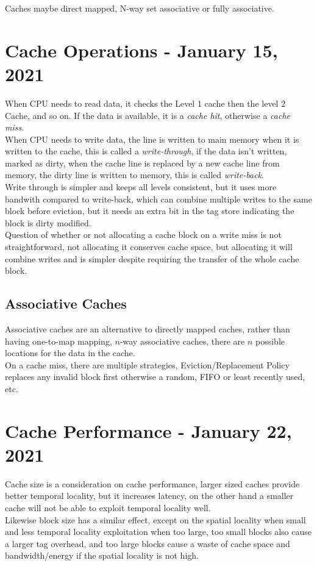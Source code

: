 \documentclass[11pt,a4paper,twocolumn]{book}
\begin{document}
Caches maybe direct mapped, N-way set associative or fully associative.

\chapter{Cache Operations - January 15, 2021}

When CPU needs to read data, it checks the Level 1 cache then the level 2 Cache, and so on. If the data is available, it is a \textit{cache hit}, otherwise a \textit{cache miss}.\\

When CPU needs to write data, the line is written to main memory when it is written to the cache, this is called a \textit{write-through}, if the data isn't written, marked as dirty, when the cache line is replaced by a new cache line from memory, the dirty line is written to memory, this is called \textit{write-back}.\\

Write through is simpler and keeps all levels consistent, but it uses more bandwith compared to write-back, which can combine multiple writes to the same block before eviction,  but it needs an extra bit in the tag store indicating the block is dirty modified.\\

Question of whether or not allocating a cache block on a write miss is not straightforward, not allocating it conserves cache space, but allocating it will combine writes and is simpler despite requiring the transfer of the whole cache block.

\section{Associative Caches}

Associative caches are an alternative to directly mapped caches, rather than having one-to-map mapping, $n$-way associative caches, there are $n$ possible locations for the data in the cache.\\

On a cache miss, there are multiple strategies, Eviction/Replacement Policy replaces any invalid block first otherwise a random, FIFO or least recently used, etc.

\chapter{Cache Performance - January 22, 2021}

Cache size is a consideration on cache performance, larger sized caches provide better temporal locality, but it increases latency, on the other hand a smaller cache will not be able to exploit temporal locality well.\\

Likewise block size has a similar effect, except on the spatial locality when small and less temporal locality exploitation when too large, too small blocks also cause a larger tag overhead, and too large blocks cause a waste of cache space and bandwidth/energy if the spatial locality is not high.
\end{document}
